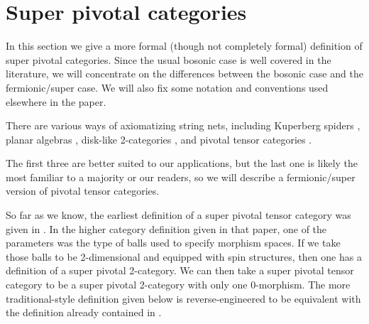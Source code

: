 



\section{Super pivotal categories}  \label{def_sect}

In this section we give a more formal (though not completely formal) definition of super pivotal categories.
Since the usual bosonic case is well covered in the literature, we will concentrate on
the differences between the bosonic case and the fermionic/super case.
We will also fix some notation and conventions used elsewhere in the paper.


There are various ways of axiomatizing string nets, including Kuperberg spiders \cite{kup_spider}, 
planar algebras \cite{jones_pa},
disk-like 2-categories \cite{blob_paper}, and pivotal tensor categories \cite{Joyal1991}.

The first three are better suited to our applications, but the last one is likely the most familiar to a majority or our readers,
so we will describe a fermionic/super version of pivotal tensor categories.

So far as we know, the earliest definition of a super pivotal tensor category was given in \cite{blob_paper}.
In the higher category definition given in that paper, one of the parameters was the type of balls used to 
specify morphism spaces.
If we take those balls to be 2-dimensional and equipped with spin structures, then one has a definition of a super pivotal 2-category.
We can then take a super pivotal tensor category to be a super pivotal 2-category with only one 0-morphism.
The more traditional-style definition given below is reverse-engineered to be
equivalent with the definition already contained in \cite{blob_paper}.

\medskip


